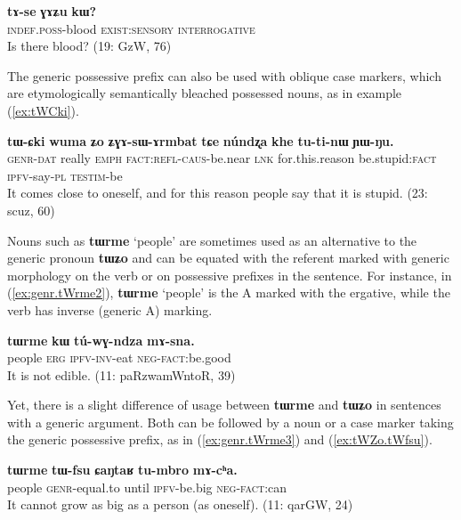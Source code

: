 \documentclass[oneside,a4paper,11pt]{article}
\newcommand{\ipa}[1]{\textbf{\phon\mbox{#1}}} %
\newcommand{\refb}[1]{(\ref{#1})}
\begin{document}
\begin{exe}
\ex  \label{ex:tAse}
\gll
\ipa{tɤ-se} 	\ipa{ɣɤʑu} 	\ipa{kɯ?} \\
\textsc{indef.poss}-blood \textsc{exist:sensory} \textsc{interrogative} \\
\glt Is there blood? (19: GzW, 76)
\end{exe}

The generic possessive prefix can also be used with oblique case markers, which are etymologically semantically bleached possessed nouns, as in example \refb{ex:tWCki}.

\begin{exe}
\ex  \label{ex:tWCki}
\gll
\ipa{tɯ-ɕki} 	\ipa{wuma} 	\ipa{ʑo} 	\ipa{ʑɣɤ-sɯ-ɤrmbat} 	\ipa{tɕe} 	\ipa{núndʐa} 	\ipa{khe} 	\ipa{tu-ti-nɯ} 	\ipa{ɲɯ-ŋu.} \\
\textsc{genr-dat} really \textsc{emph} \textsc{fact:refl-caus}-be.near \textsc{lnk} for.this.reason be.stupid:\textsc{fact} \textsc{ipfv}-say-\textsc{pl} \textsc{testim}-be \\
\glt It comes close to oneself, and for this reason people say that it is stupid. (23: scuz, 60)
\end{exe}

Nouns such as \ipa{tɯrme} `people' are sometimes used as an alternative to the generic pronoun \ipa{tɯʑo} and can be equated with the referent marked with generic morphology on the verb or on possessive prefixes in the sentence. For instance, in \refb{ex:genr.tWrme2}, \ipa{tɯrme} `people' is the A marked with the ergative, while the verb has inverse (generic A) marking.


\begin{exe}
\ex  \label{ex:genr.tWrme2}
\gll
\ipa{tɯrme} 	\ipa{kɯ} 	\ipa{tú-wɣ-ndza} 	\ipa{mɤ-sna.} \\
people \textsc{erg} \textsc{ipfv-inv}-eat \textsc{neg-fact}:be.good \\
\glt It is not edible. (11: paRzwamWntoR, 39)
\end{exe}

Yet, there is a slight difference of usage between \ipa{tɯrme} and \ipa{tɯʑo} in sentences with a generic argument. Both can be followed by a noun or a case marker taking the generic possessive prefix, as in \refb{ex:genr.tWrme3} and \refb{ex:tWZo.tWfsu}. 

\begin{exe}
\ex  \label{ex:genr.tWrme3}
\gll
\ipa{tɯrme} 	\ipa{tɯ-fsu} 	\ipa{ɕaŋtaʁ} 	\ipa{tu-mbro} 	\ipa{mɤ-cʰa.} \\
people \textsc{genr}-equal.to until \textsc{ipfv}-be.big \textsc{neg-fact}:can \\ 
\glt It cannot grow as big as a person (as oneself). (11: qarGW, 24)
\end{exe}
\end{document}

